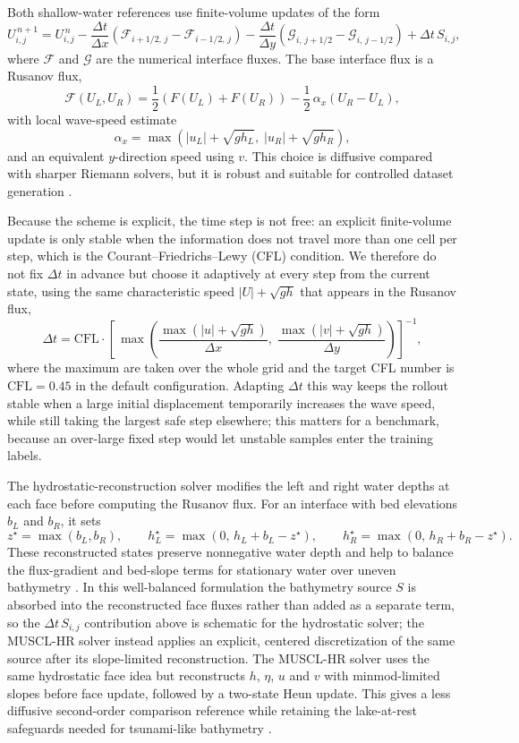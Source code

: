 Both shallow-water references use finite-volume updates of the form
\[ %
U_{i, j} ^ {\,n + 1} = U_{i, j} ^ {\,n}
- \frac{\Delta t}{\Delta x} \left(\mathcal{F}_{i + 1/2,\, j} - \mathcal{F}_{i - 1/2,\, j}\right)
- \frac{\Delta t}{\Delta y} \left(\mathcal{G}_{i,\, j + 1/2} - \mathcal{G}_{i,\, j - 1/2}\right)
+ \Delta t\, S_{i, j},
\]
where $\mathcal{F}$ and $\mathcal{G}$ are the numerical interface fluxes. The base interface flux is a Rusanov flux,
\[
\mathcal{F}(U_L, U_R) = \frac{1}{2}\left(F(U_L) + F(U_R)\right) - \frac{1}{2}\,\alpha_x\left(U_R - U_L\right),
\]
with local wave-speed estimate
\[
\alpha_x = \max\!\left(|u_L| + \sqrt{g h_L},\; |u_R| + \sqrt{g h_R}\right),
\]
and an equivalent $y$-direction speed using $v$. This choice is diffusive compared with sharper Riemann solvers, but it is robust and suitable for controlled dataset generation \citep{toro2009riemann,toro2026rusanov}.

Because the scheme is explicit, the time step is not free: an explicit finite-volume update is only stable when the information does not travel more than one cell per step, which is the Courant--Friedrichs--Lewy (CFL) condition. We therefore do not fix $\Delta t$ in advance but choose it adaptively at every step from the current state, using the same characteristic speed $|U| + \sqrt{gh}$ that appears in the Rusanov flux,
\[
\Delta t = \mathrm{CFL} \cdot \left[\,\max \! \left(\frac{\max(|u| + \sqrt{gh})}{\Delta x},\; \frac{\max(|v| +  \sqrt{gh})}{\Delta y} \right) \right] ^ {-1},
\]
where the maximum are taken over the whole grid and the target CFL number is $\mathrm{CFL} = 0.45$ in the default configuration. Adapting $\Delta t$ this way keeps the rollout stable when a large initial displacement temporarily increases the wave speed, while still taking the largest safe step elsewhere; this matters for a benchmark, because an over-large fixed step would let unstable samples enter the training labels.

The hydrostatic-reconstruction solver modifies the left and right water depths at each face before computing the Rusanov flux. For an interface with bed elevations $b_L$ and $b_R$, it sets
\[
z ^ \star = \max(b_L, b_R), \qquad
h_L ^ \star = \max(0,\, h_L + b_L - z ^ \star), \qquad
h_R ^ \star = \max(0,\, h_R + b_R - z ^ \star).
\]
These reconstructed states preserve nonnegative water depth and help to balance the flux-gradient and bed-slope terms for stationary water over uneven bathymetry \citep{audusse2004hydrostatic}. In this well-balanced formulation the bathymetry source $S$ is absorbed into the reconstructed face fluxes rather than added as a separate term, so the $\Delta t\, S_{i, j}$ contribution above is schematic for the hydrostatic solver; the MUSCL-HR solver instead applies an explicit, centered discretization of the same source after its slope-limited reconstruction. The MUSCL-HR solver uses the same hydrostatic face idea but reconstructs $h$, $\eta$, $u$ and $v$ with minmod-limited slopes before face update, followed by a two-state Heun update. This gives a less diffusive second-order comparison reference while retaining the lake-at-rest safeguards needed for tsunami-like bathymetry \citep{clain2016secondorder, hou2015muscl}.


